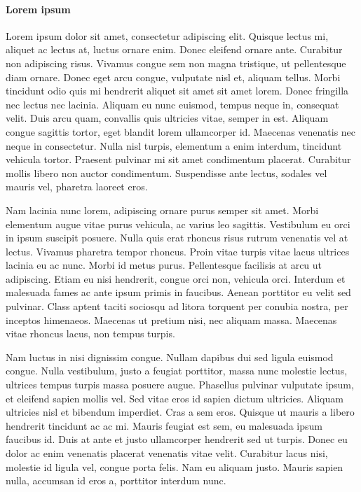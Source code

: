 \paragraph{Lorem ipsum}
Lorem ipsum dolor sit amet, consectetur adipiscing elit. Quisque lectus
mi, aliquet ac lectus at, luctus ornare enim. Donec eleifend ornare
ante. Curabitur non adipiscing risus. Vivamus congue sem non magna
tristique, ut pellentesque diam ornare. Donec eget arcu congue, vulputate
nisl et, aliquam tellus. Morbi tincidunt odio quis mi hendrerit aliquet
sit amet sit amet lorem. Donec fringilla nec lectus nec lacinia. Aliquam
eu nunc euismod, tempus neque in, consequat velit. Duis arcu quam,
convallis quis ultricies vitae, semper in est. Aliquam congue sagittis
tortor, eget blandit lorem ullamcorper id. Maecenas venenatis nec
neque in consectetur. Nulla nisl turpis, elementum a enim interdum,
tincidunt vehicula tortor. Praesent pulvinar mi sit amet condimentum
placerat. Curabitur mollis libero non auctor condimentum. Suspendisse
ante lectus, sodales vel mauris vel, pharetra laoreet eros.

Nam lacinia nunc lorem, adipiscing ornare purus semper sit amet. Morbi
elementum augue vitae purus vehicula, ac varius leo sagittis. Vestibulum
eu orci in ipsum suscipit posuere. Nulla quis erat rhoncus risus rutrum
venenatis vel at lectus. Vivamus pharetra tempor rhoncus. Proin vitae
turpis vitae lacus ultrices lacinia eu ac nunc. Morbi id metus purus.
Pellentesque facilisis at arcu ut adipiscing. Etiam eu nisi hendrerit,
congue orci non, vehicula orci. Interdum et malesuada fames ac ante
ipsum primis in faucibus. Aenean porttitor eu velit sed pulvinar.
Class aptent taciti sociosqu ad litora torquent per conubia nostra,
per inceptos himenaeos. Maecenas ut pretium nisi, nec aliquam massa.
Maecenas vitae rhoncus lacus, non tempus turpis.

Nam luctus in nisi dignissim congue. Nullam dapibus dui sed ligula
euismod congue. Nulla vestibulum, justo a feugiat porttitor, massa
nunc molestie lectus, ultrices tempus turpis massa posuere augue.
Phasellus pulvinar vulputate ipsum, et eleifend sapien mollis vel.
Sed vitae eros id sapien dictum ultricies. Aliquam ultricies nisl
et bibendum imperdiet. Cras a sem eros. Quisque ut mauris a libero
hendrerit tincidunt ac ac mi. Mauris feugiat est sem, eu malesuada
ipsum faucibus id. Duis at ante et justo ullamcorper hendrerit sed
ut turpis. Donec eu dolor ac enim venenatis placerat venenatis vitae
velit. Curabitur lacus nisi, molestie id ligula vel, congue porta
felis. Nam eu aliquam justo. Mauris sapien nulla, accumsan id eros
a, porttitor interdum nunc.

